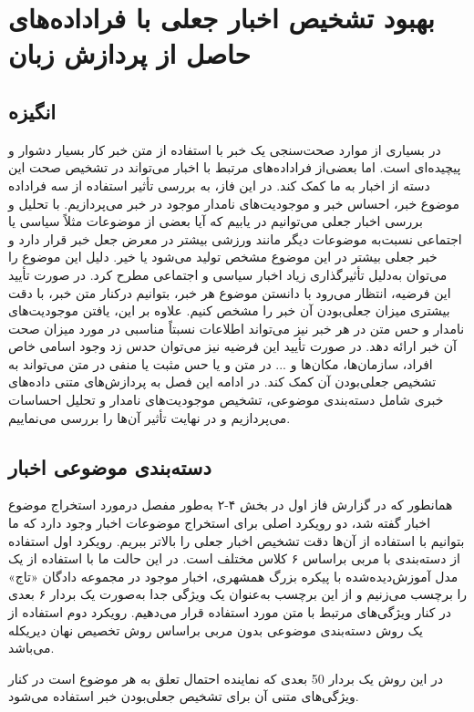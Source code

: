 \chapter{بهبود تشخیص اخبار جعلی با فراداده‌های حاصل از پردازش زبان}
\section{انگیزه}
در بسیاری از موارد  صحت‌سنجی یک خبر با استفاده از متن خبر کار بسیار دشوار و پیچیده‌ای است. اما بعضی‌از فراداده‌های مرتبط با اخبار می‌تواند در تشخیص صحت این دسته از اخبار به ما کمک کند. در این فاز، به بررسی تأثیر استفاده از سه فراداده موضوع خبر، احساس خبر و موجودیت‌های نامدار موجود در خبر می‌پردازیم. با تحلیل و بررسی اخبار جعلی می‌توانیم در یابیم که آیا بعضی از موضوعات مثلاً سیاسی یا اجتماعی نسبت‌به موضوعات دیگر مانند ورزشی بیشتر در معرض جعل خبر قرار دارد و خبر جعلی بیشتر در این موضوع مشخص تولید می‌شود یا خیر. دلیل این موضوع را می‌توان به‌دلیل تأثیرگذاری زیاد اخبار سیاسی و اجتماعی مطرح کرد. در صورت تأیید این فرضیه، انتظار می‌رود با دانستن موضوع هر خبر، بتوانیم درکنار متن خبر، با دقت بیشتری میزان جعلی‌بودن آن خبر را مشخص کنیم. علاوه بر این، یافتن موجودیت‌های نامدار و حس متن در هر خبر نیز می‌تواند اطلاعات نسبتاً مناسبی در مورد میزان صحت آن خبر ارائه دهد. در صورت تأیید این فرضیه نیز می‌توان حدس زد وجود اسامی خاص افراد، سازمان‌ها، مکان‌ها و ... در متن و یا حس مثبت یا منفی در متن می‌تواند به تشخیص جعلی‌بودن آن کمک کند. در ادامه این فصل به پردازش‌های متنی داده‌های خبری شامل دسته‌بندی موضوعی، تشخیص موجودیت‌های نامدار و تحلیل احساسات می‌پردازیم و در نهایت تأثیر آن‌ها را بررسی می‌نماییم.

\section{دسته‌بندی موضوعی اخبار}
همانطور که در گزارش فاز اول در بخش ۴-۲ به‌طور مفصل درمورد استخراج موضوع اخبار گفته شد، دو رویکرد اصلی برای استخراج موضوعات اخبار وجود دارد که ما بتوانیم با استفاده از آن‌ها دقت تشخیص اخبار جعلی را بالاتر ببریم. رویکرد اول استفاده از دسته‌بندی با مربی براساس ۶ کلاس مختلف است. در این حالت ما با استفاده از یک مدل آموزش‌دیده‌شده با پیکره بزرگ همشهری\citep{AleAhmad2009}، اخبار موجود در مجموعه دادگان «تاج» را برچسب می‌زنیم و از این برچسب به‌عنوان یک ویژگی جدا به‌صورت یک بردار ۶ بعدی در کنار ویژگی‌های مرتبط با متن مورد استفاده قرار می‌دهیم. رویکرد دوم استفاده از یک روش دسته‌بندی موضوعی بدون مربی 
	براساس روش تخصیص نهان دیریکله \citep{blei2003latent} می‌باشد. 
	
در این روش یک بردار 50 بعدی که نماینده احتمال تعلق به هر موضوع است در کنار ویژگی‌های متنی آن برای تشخیص جعلی‌بودن خبر استفاده می‌شود.

